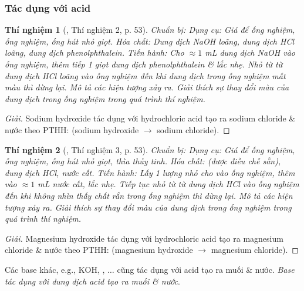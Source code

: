\documentclass{article}
\newtheorem{thinghiem}{Thí nghiệm}
\begin{document}
\subsubsection{Tác dụng với acid}

\begin{thinghiem}[\cite{SGK_KHTN_8_Canh_Dieu}, Thí nghiệm 2, p. 53]
	{\rm Chuẩn bị:} Dụng cụ: Giá để ống nghiệm, ống nghiệm, ống hút nhỏ giọt. Hóa chất: Dung dịch {\rm NaOH} loãng, dung dịch {\rm HCl} loãng, dung dịch phenolphthalein. {\rm Tiến hành:} Cho $\approx1$ {\rm mL} dung dịch {\rm NaOH} vào ống nghiệm, thêm tiếp 1 giọt dung dịch phenolphthalein \& lắc nhẹ. Nhỏ từ từ dung dịch {\rm HCl} loãng vào ống nghiệm đến khi dung dịch trong ống nghiệm mất màu thì dừng lại. Mô tả các hiện tượng xảy ra. Giải thích sự thay đổi màu của dung dịch trong ống nghiệm trong quá trình thí nghiệm.
\end{thinghiem}

\begin{proof}[Giải]
	Sodium hydroxide tác dụng với hydrochloric acid tạo ra sodium chloride \& nước theo PTHH:  (sodium hydroxide $\to$ sodium chloride).
\end{proof}

\begin{thinghiem}[\cite{SGK_KHTN_8_Canh_Dieu}, Thí nghiệm 3, p. 53]
	{\rm Chuẩn bị:} Dụng cụ: Giá để ống nghiệm, ống nghiệm, ống hút nhỏ giọt, thìa thủy tinh. Hóa chất: {\rm{}} (được điều chế sẵn), dung dịch {\rm HCl}, nước cất. {\rm Tiến hành:} Lấy 1 lượng nhỏ {\rm{}} cho vào ống nghiệm, thêm vào $\approx1$ {\rm mL} nước cất, lắc nhẹ. Tiếp tục nhỏ từ từ dung dịch {\rm HCl} vào ống nghiệm đến khi không nhìn thấy chất rắn trong ống nghiệm thì dừng lại. Mô tả các hiện tượng xảy ra. Giải thích sự thay đổi màu của dung dịch trong ống nghiệm trong quá trình thí nghiệm.
\end{thinghiem}

\begin{proof}[Giải]
	Magnesium hydroxide tác dụng với hydrochloric acid tạo ra magnesium chloride \& nước theo PTHH:  (magnesium hydroxide $\to$ magnesium chloride).
\end{proof}
Các base khác, e.g., KOH, , $\ldots$ cũng tác dụng với acid tạo ra muối \& nước. \textit{Base tác dụng với dung dịch acid tạo ra muối \& nước}.
\end{document}
